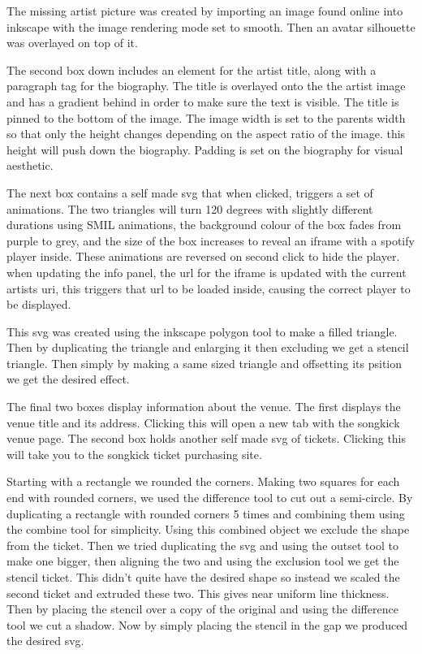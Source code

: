 \documentclass[10pt]{article}
\begin{document}
                The missing artist picture was created by importing an image found online into inkscape with the image rendering mode set to smooth. Then an avatar silhouette was overlayed on top of it.

                The second box down includes an element for the artist title, along with a paragraph tag for the biography. The title is overlayed onto the the artist image and has a gradient behind in order to make sure the text is visible. The title is pinned to the bottom of the image. The image width is set to the parents width so that only the height changes depending on the aspect ratio of the image. this height will push down the biography. Padding is set on the biography for visual aesthetic.

                The next box contains a self made svg that when clicked, triggers a set of animations. The two triangles will turn 120 degrees with slightly different durations using SMIL animations, the background colour of the box fades from purple to grey, and the size of the box increases to reveal an iframe with a spotify player inside. These animations are reversed on second click to hide the player. when updating the info panel, the url for the iframe is updated with the current artists uri, this triggers that url to be loaded inside, causing the correct player to be displayed.

                This svg was created using the inkscape polygon tool to make a filled triangle. Then by duplicating the triangle and enlarging it then excluding we get a stencil triangle. Then simply by making a same sized triangle and offsetting its psition we get the desired effect.

                The final two boxes display information about the venue. The first displays the venue title and its address. Clicking this will open a new tab with the songkick venue page. The second box holds another self made svg of tickets. Clicking this will take you to the songkick ticket purchasing site.

                Starting with a rectangle we rounded the corners. Making two squares for each end with rounded corners, we used the difference tool to cut out a semi-circle. By duplicating a rectangle with rounded corners 5 times and combining them using the combine tool for simplicity. Using this combined object we exclude the shape from the ticket. Then we tried duplicating the svg and using the outset tool to make one bigger, then aligning the two and using the exclusion tool we get the stencil ticket. This didn't quite have the desired shape so instead we scaled the second ticket and extruded these two. This gives near uniform line thickness. Then by placing the stencil over a copy of the original and using the difference tool we cut a shadow. Now by simply placing the stencil in the gap we produced the desired svg. 
\end{document}
